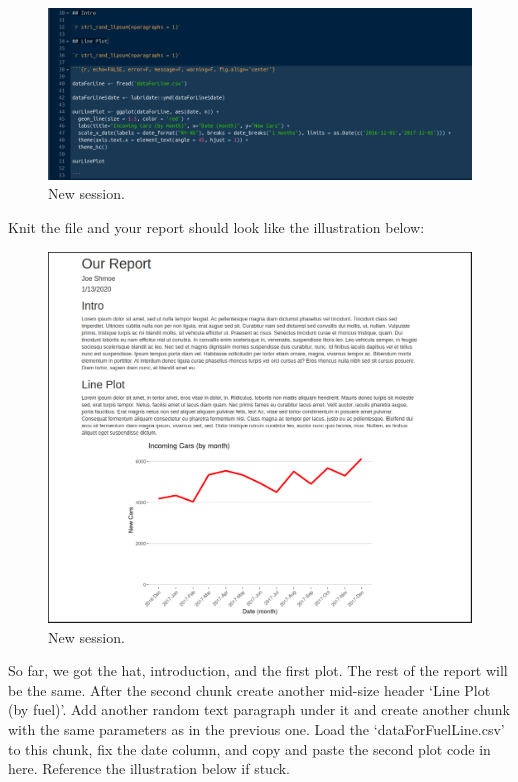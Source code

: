 \documentclass[]{book}
\begin{document}
\begin{figure}
\centering
\includegraphics{markdown6.png}
\caption{New session.}
\end{figure}

Knit the file and your report should look like the illustration below:

\begin{figure}
\centering
\includegraphics{markdown7.png}
\caption{New session.}
\end{figure}

So far, we got the hat, introduction, and the first plot. The rest of the report will be the same. After the second chunk create another mid-size header `Line Plot (by fuel)'. Add another random text paragraph under it and create another chunk with the same parameters as in the previous one. Load the `dataForFuelLine.csv' to this chunk, fix the date column, and copy and paste the second plot code in here. Reference the illustration below if stuck.
\end{document}
